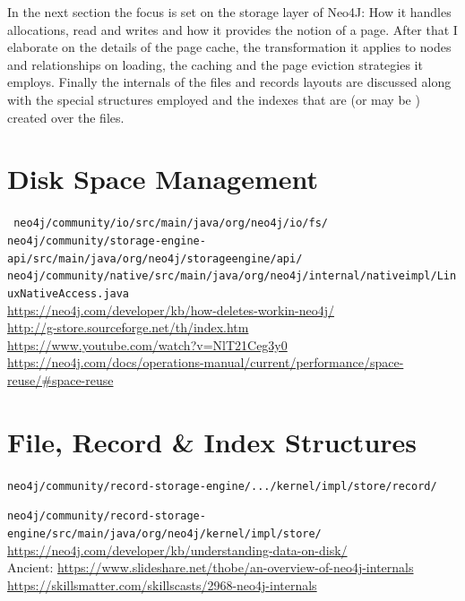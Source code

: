\documentclass[a4paper,10pt]{article}
\begin{document}
In the next section the focus is set on the storage layer of Neo4J: How it handles allocations, read and writes and how it provides the notion of a page. After that I elaborate on the details of the page cache, the transformation it applies to nodes and relationships on loading, the caching and the page eviction strategies it employs. Finally the internals of the files and records layouts are discussed along with the special structures employed and the indexes that are (or may be ) created over the files.
\section{Disk Space Management}
\texttt{
neo4j/community/io/src/main/java/org/neo4j/io/fs/
} \\

\texttt{neo4j/community/storage-engine-api/src/main/java/org/neo4j/storageengine/api/} \\

\texttt{neo4j/community/native/src/main/java/org/neo4j/internal/nativeimpl/LinuxNativeAccess.java} \\

\href{Hpw delete works}{https://neo4j.com/developer/kb/how-deletes-workin-neo4j/} \\

\href{G-Store}{http://g-store.sourceforge.net/th/index.htm} \\

\href{Algorithms \& data structures}{https://www.youtube.com/watch?v=NlT21Ceg3y0}  \\

\href{Reusing space}{https://neo4j.com/docs/operations-manual/current/performance/space-reuse/\#space-reuse} \\

\section{File, Record \& Index Structures}
\texttt{neo4j/community/record-storage-engine/.../kernel/impl/store/record/}

\texttt{neo4j/community/record-storage-engine/src/main/java/org/neo4j/kernel/impl/store/} \\

\href{Layout N4J}{https://neo4j.com/developer/kb/understanding-data-on-disk/} \\

Ancient: \href{Slides: Internals Of N4J}{https://www.slideshare.net/thobe/an-overview-of-neo4j-internals} \\
\href{Video}{https://skillsmatter.com/skillscasts/2968-neo4j-internals} \\
\end{document}
